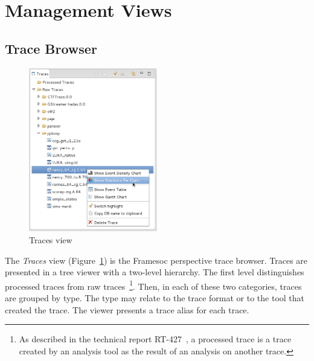 \documentclass[twoside]{article}
\begin{document}
\begin{sloppypar}
\section{Management Views}
\label{sec:management}

\subsection{Trace Browser}
\label{subsec:explorer}

\begin{figure}[h!]
  \centering
    \includegraphics[width=0.5\textwidth]{images/trace_browser_popup.png}
  \caption{Traces view}
  \label{fig:popup_explorer}
\end{figure}

The \emph{Traces} view (Figure~\ref{fig:popup_explorer}) is the Framesoc perspective trace browser.
Traces are presented in a tree viewer with a two-level hierarchy. 
The first level distinguishes processed traces from raw traces~\footnote{As described in the technical report RT-427~\cite{pagano:hal}, a processed trace is a trace created by an analysis tool as the result of an analysis on another trace.}. 
Then, in each of these two categories, traces are grouped by type. 
The type may relate to the trace format or to the tool that created the trace. 
The viewer presents a trace alias for each trace.


\end{sloppypar}
\end{document}
